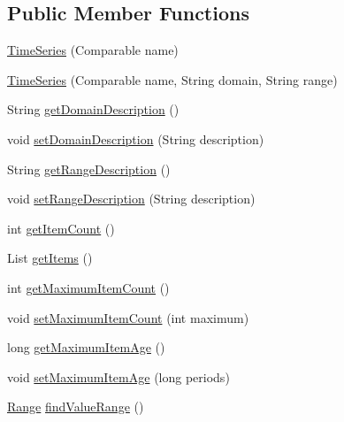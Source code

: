 \subsection*{Public Member Functions}
\begin{DoxyCompactItemize}
\item 
\mbox{\hyperlink{classorg_1_1jfree_1_1data_1_1time_1_1_time_series_aa6b4c5301e09f6a1d4551a68a6c28ea9}{Time\+Series}} (Comparable name)
\item 
\mbox{\hyperlink{classorg_1_1jfree_1_1data_1_1time_1_1_time_series_a07b3d1972975d625216d9c424a3c4f6a}{Time\+Series}} (Comparable name, String domain, String range)
\item 
String \mbox{\hyperlink{classorg_1_1jfree_1_1data_1_1time_1_1_time_series_a08680700093b691679af7f6fe5eddd0d}{get\+Domain\+Description}} ()
\item 
void \mbox{\hyperlink{classorg_1_1jfree_1_1data_1_1time_1_1_time_series_ad44fd7f203d6ba10a356a1bb55abbbc9}{set\+Domain\+Description}} (String description)
\item 
String \mbox{\hyperlink{classorg_1_1jfree_1_1data_1_1time_1_1_time_series_a9a904357e8aef246ccadba5165add5e1}{get\+Range\+Description}} ()
\item 
void \mbox{\hyperlink{classorg_1_1jfree_1_1data_1_1time_1_1_time_series_a67fa8ee54ca85ec0e7b645d1464d11f5}{set\+Range\+Description}} (String description)
\item 
int \mbox{\hyperlink{classorg_1_1jfree_1_1data_1_1time_1_1_time_series_a21bdc5039a20c6d5c31cdcdd741d980e}{get\+Item\+Count}} ()
\item 
List \mbox{\hyperlink{classorg_1_1jfree_1_1data_1_1time_1_1_time_series_aa25a696d3ad0b3e9d7aa85733e56caa5}{get\+Items}} ()
\item 
int \mbox{\hyperlink{classorg_1_1jfree_1_1data_1_1time_1_1_time_series_abcbd350f6c7bcd4cad3405a457afff4d}{get\+Maximum\+Item\+Count}} ()
\item 
void \mbox{\hyperlink{classorg_1_1jfree_1_1data_1_1time_1_1_time_series_aa263837dfa3b2b03d6bd7c2da6afe940}{set\+Maximum\+Item\+Count}} (int maximum)
\item 
long \mbox{\hyperlink{classorg_1_1jfree_1_1data_1_1time_1_1_time_series_a354525b3ed2463cc3ea0fd998bc91faa}{get\+Maximum\+Item\+Age}} ()
\item 
void \mbox{\hyperlink{classorg_1_1jfree_1_1data_1_1time_1_1_time_series_a5bbe512bae71cd45eb54d15a9d4b4a7f}{set\+Maximum\+Item\+Age}} (long periods)
\item 
\mbox{\hyperlink{classorg_1_1jfree_1_1data_1_1_range}{Range}} \mbox{\hyperlink{classorg_1_1jfree_1_1data_1_1time_1_1_time_series_a9acc59a02f5df33152e518b0fe654cbe}{find\+Value\+Range}} ()

\end{DoxyCompactItemize}
